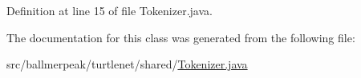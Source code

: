 Definition at line 15 of file Tokenizer.\-java.



The documentation for this class was generated from the following file\-:\begin{DoxyCompactItemize}
\item 
src/ballmerpeak/turtlenet/shared/\hyperlink{Tokenizer_8java}{Tokenizer.\-java}\end{DoxyCompactItemize}
